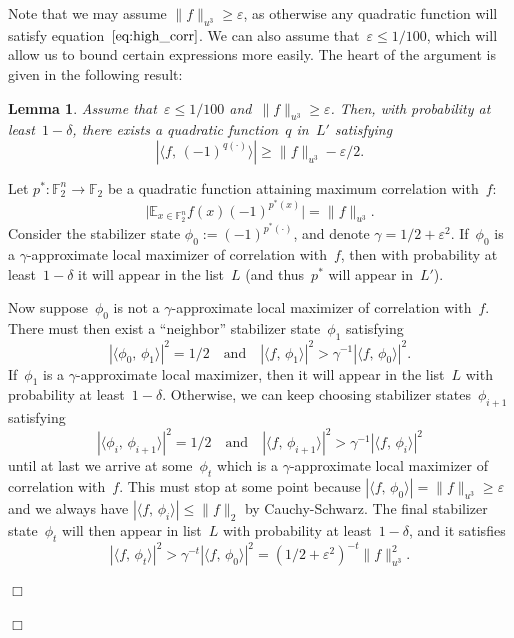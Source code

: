 \documentclass[11pt]{amsart}
\newcommand{\E}{\mathbb{E}}
\newcommand{\F}{\mathbb{F}} %
\newcommand{\eps}{\varepsilon}
\theoremstyle{plain}
\newtheorem{lemma}[theorem]{Lemma}
\theoremstyle{definition}
\theoremstyle{remark}
\renewenvironment{proof}[1][]{
    	\begin{trivlist}
     	\item[\hspace{\labelsep}{\em\noindent Proof#1:\/}]}
     	{{\hfill$\Box$}
    	\end{trivlist}
  }
\begin{document}
\begin{proof}[ of \cref{thm:quadratic_GL}]
Note that we may assume $\|f\|_{u^3} \geq \eps$, as otherwise any quadratic function will satisfy equation~$\eqref{eq:high_corr}$.
We can also assume that~$\eps \leq 1/100$, which will allow us to bound certain expressions more easily.
The heart of the argument is given in the following result:

\begin{lemma} \label{lem:find_quad}
    Assume that~$\eps \leq 1/100$ and~$\|f\|_{u^3} \geq \eps$.
    Then, with probability at least~$1-\delta$, there exists a quadratic function~$q$ in~$L'$ satisfying
    $$|\langle f,\, (-1)^{q(\cdot)}\rangle| \geq \|f\|_{u^3} - \eps/2.$$
\end{lemma}

\begin{proof}
Let $p^*: \F_2^n \to \F_2$ be a quadratic function attaining maximum correlation with~$f$:
$$\big|\E_{x\in \F_2^n} f(x) (-1)^{p^*(x)}\big| = \|f\|_{u^3}.$$
Consider the stabilizer state $\phi_0 := (-1)^{p^*(\cdot)}$, and denote $\gamma = 1/2+\eps^2$.
If~$\phi_0$ is a $\gamma$-approximate local maximizer of correlation with~$f$, then with probability at least~$1-\delta$ it will appear in the list~$L$
(and thus~$p^*$ will appear in~$L'$).

Now suppose~$\phi_0$ is not a $\gamma$-approximate local maximizer of correlation with~$f$.
There must then exist a ``neighbor'' stabilizer state~$\phi_1$ satisfying
$$|\langle\phi_0,\, \phi_1\rangle|^2 = 1/2 \quad \text{and} \quad |\langle f,\, \phi_1 \rangle|^2 > \gamma^{-1} |\langle f,\, \phi_0 \rangle|^2.$$
If~$\phi_1$ is a $\gamma$-approximate local maximizer, then it will appear in the list~$L$ with probability at least~$1-\delta$.
Otherwise, we can keep choosing stabilizer states~$\phi_{i+1}$ satisfying
$$|\langle\phi_i,\, \phi_{i+1}\rangle|^2 = 1/2 \quad \text{and} \quad |\langle f,\, \phi_{i+1} \rangle|^2 > \gamma^{-1} |\langle f,\, \phi_i \rangle|^2$$
until at last we arrive at some~$\phi_t$ which is a $\gamma$-approximate local maximizer of correlation with~$f$.
This must stop at some point because $|\langle f,\, \phi_0 \rangle| = \|f\|_{u^3} \geq \eps$ and we always have $|\langle f,\, \phi_i \rangle| \leq \|f\|_2$ by Cauchy-Schwarz.
The final stabilizer state~$\phi_t$ will then appear in list~$L$ with probability at least~$1-\delta$, and it satisfies
\begin{equation} \label{eq:corr_phi_t}
    |\langle f,\, \phi_t \rangle|^2 > \gamma^{-t} |\langle f,\, \phi_0 \rangle|^2 = (1/2+\eps^2)^{-t} \|f\|_{u^3}^2.
\end{equation}


\end{proof}
\end{proof}
\end{document}

